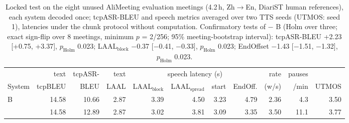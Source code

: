 \begin{table}[t]
\centering\small
\setlength{\tabcolsep}{3.5pt}
\begin{tabular}{lrrrrrrrrrr}
\toprule
 & text & tcpASR- & text & \multicolumn{4}{c}{speech latency (s)} & rate & pauses & \\
\cmidrule(lr){5-8}
System & tcpBLEU & BLEU & LAAL & LAAL$_\text{block}$ & LAAL$_\text{spread}$ & start & EndOff. & (w/s) & /min & UTMOS \\
\midrule
B & 14.58 & 10.66 & 2.87 & 3.39 & 4.50 & 3.23 & 4.79 & 2.36 & 4.3 & 3.50 \\
\sys{} & 14.58 & 12.89 & 2.87 & 3.02 & 3.81 & 3.09 & 3.35 & 3.50 & 11.1 & 3.77 \\
\bottomrule
\end{tabular}
\caption{Locked test on the eight unused AliMeeting evaluation meetings (4.2\,h, Zh$\rightarrow$En, DiariST human references), each system decoded once; tcpASR-BLEU and speech metrics averaged over two TTS seeds (UTMOS: seed 1), latencies under the chunk protocol without computation. Confirmatory tests of \sys{} $-$ B (Holm over three; exact sign-flip over 8 meetings, minimum $p$ = 2/256; 95\% meeting-bootstrap interval): tcpASR-BLEU +2.23 [+0.75, +3.37], $p_\text{Holm}$ 0.023; LAAL$_\text{block}$ $-$0.37 [$-$0.41, $-$0.33], $p_\text{Holm}$ 0.023; EndOffset $-$1.43 [$-$1.51, $-$1.32], $p_\text{Holm}$ 0.023.}
\label{tab:alieval}
\end{table}
